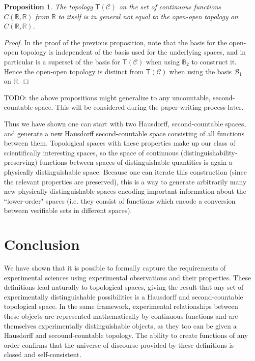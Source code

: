 \documentclass[review]{elsarticle}
\theoremstyle{plain}%
\newtheorem{prop}[thm]{Proposition}
\theoremstyle{definition}
\theoremstyle{remark}
\begin{document}
\begin{prop}
The topology $\mathsf{T}(\mathcal{C})$ on the set of continuous functions $C(\mathbb{R},\mathbb{R})$ from $\mathbb{R}$ to itself is in general not equal to the open-open topology on $C(\mathbb{R},\mathbb{R})$.
\end{prop}
\begin{proof}
In the proof of the previous proposition, note that the basis for the open-open topology is independent of the basis used for the underlying spaces, and in particular is a superset of the basis for $\mathsf{T}(\mathcal{C})$ when using $\mathbb{B}_2$ to construct it. Hence the open-open topology is distinct from $\mathsf{T}(\mathcal{C})$ when using the basis $\mathcal{B}_1$ on $\mathbb{R}$. 
\end{proof}

TODO: the above propositions might generalize to any uncountable, second-countable space. This will be considered during the paper-writing process later. 

Thus we have shown one can start with two Hausdorff, second-countable spaces, and generate a new Hausdorff second-countable space consisting of all functions between them. Topological spaces with these properties make up our class of scientifically interesting spaces, so the space of continuous (distinguishability-preserving) functions between spaces of distinguishable quantities is again a physically distinguishable space. Because one can iterate this construction (since the relevant properties are preserved), this is a way to generate arbitrarily many new physically distinguishable spaces encoding important information about the ``lower-order" spaces (i.e. they consist of functions which encode a conversion between verifiable sets in different spaces).


\section{Conclusion}

We have shown that it is possible to formally capture the requirements of experimental sciences using experimental observations and their properties. These definitions lead naturally to topological spaces, giving the result that any set of experimentally distinguishable possibilities is a Hausdorff and second-countable topological space. In the same framework, experimental relationships between these objects are represented mathematically by continuous functions and are themselves experimentally distinguishable objects, as they too can be given a Hausdorff and secound-countable topology. The ability to create functions of any order confirms that the universe of discourse provided by these definitions is closed and self-consistent.
\end{document}
